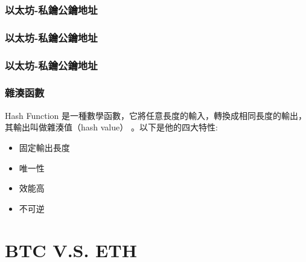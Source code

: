 \documentclass[xcolor=dvipsnames]{beamer}
\begin{document}
\begin{frame}
\frametitle{以太坊-私鑰公鑰地址}
\begin{figure}
    \end{figure}
\end{frame}
\begin{frame}
\frametitle{以太坊-私鑰公鑰地址}
\begin{figure}
    \end{figure}
\end{frame}
\begin{frame}
\frametitle{以太坊-私鑰公鑰地址}
\begin{figure}
    \end{figure}
\end{frame}
\begin{frame}
\frametitle{雜湊函數}
Hash Function 是一種數學函數，它將任意長度的輸入，轉換成相同長度的輸出，其輸出叫做雜湊值（hash value） 。以下是他的四大特性:
    \pause
\hyperlink{https://emn178.github.io/online-tools/sha256.html}{}    
\begin{itemize}
    \item 固定輸出長度
    \pause
    \item 唯一性
    \pause
    \item 效能高
    \pause
    \item 不可逆
\end{itemize}
\end{frame}

\section{BTC V.S. ETH}
\end{document}
